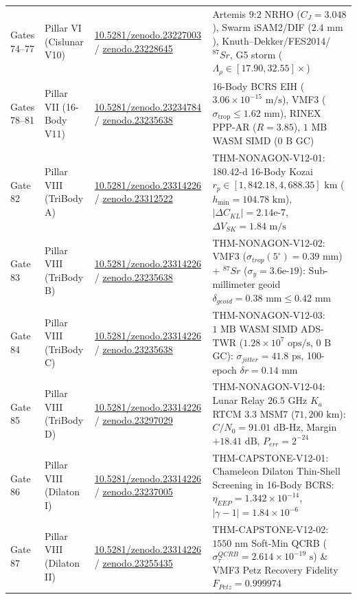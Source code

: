 \documentclass[11pt,a4paper,reqno]{article}
\def\bm#1{#1}%
\def\texttt#1{#1}%
\def\mathrm#1{#1}%
\def\mathcal#1{#1}%
\newcommand{\zenodo}[1]{\href{https://doi.org/10.5281/zenodo.#1}{\texttt{10.5281/\allowbreak zenodo.#1}}}
\newcommand{\zenodoshort}[1]{\href{https://doi.org/10.5281/zenodo.#1}{\texttt{zenodo.#1}}}
\theoremstyle{plain}
\theoremstyle{definition}
\theoremstyle{remark}
\numberwithin{equation}{section}
\begin{document}
\begin{longtable}{@{}P{2.2cm}P{2.8cm}P{3.4cm}P{7.8cm}@{}}
\texttt{Gates 74--77} & Pillar VI (Cislunar V10) & \zenodo{23227003} / \zenodoshort{23228645} & Artemis $9\text{:}2$ NRHO ($C_J=3.048$), Swarm iSAM2/DIF ($2.4\text{ mm}$), Knuth--Dekker/FES2014/$^{87}\mathrm{Sr}$, G5 storm ($\Lambda_\rho \in [17.90, 32.55]\times$) \\
\texttt{Gates 78--81} & Pillar VII (16-Body V11) & \zenodo{23234784} / \zenodoshort{23235638} & 16-Body BCRS EIH ($3.06 \times 10^{-15}\text{ m/s}$), VMF3 ($\sigma_{\text{trop}} \le 1.62\text{ mm}$), RINEX PPP-AR ($R=3.85$), $1\text{ MB}$ WASM SIMD ($0\text{ B}$ GC) \\
\midrule
\texttt{Gate 82} & Pillar VIII (TriBody A) & \zenodo{23314226} / \zenodoshort{23312522} & \texttt{THM-NONAGON-V12-01}: 180.42-d 16-Body Kozai $r_p \in [1,842.18, 4,688.35]\text{ km}$ ($h_{\min}=104.78\text{ km}$), $|\Delta C_{\mathrm{KL}}|=2.14\text{e-}7$, $\Delta V_{\mathrm{SK}}=1.84\text{ m/s}$ \\
\texttt{Gate 83} & Pillar VIII (TriBody B) & \zenodo{23314226} / \zenodoshort{23235638} & \texttt{THM-NONAGON-V12-02}: VMF3 ($\sigma_{\mathrm{trop}}(5^\circ)=0.39\text{ mm}$) + $^{87}\mathrm{Sr}$ ($\sigma_y=3.6\text{e-}19$): Sub-millimeter geoid $\delta_{\mathrm{geoid}} = \bm{0.38\text{ mm}} \le 0.42\text{ mm}$ \\
\texttt{Gate 84} & Pillar VIII (TriBody C) & \zenodo{23314226} / \zenodoshort{23235638} & \texttt{THM-NONAGON-V12-03}: $1\text{ MB}$ WASM SIMD ADS-TWR ($\bm{1.28\times 10^7\text{ ops/s}}$, $0\text{ B}$ GC): $\sigma_{\mathrm{jitter}} = \bm{41.8\text{ ps}}$, 100-epoch $\delta r = \bm{0.14\text{ mm}}$ \\
\texttt{Gate 85} & Pillar VIII (TriBody D) & \zenodo{23314226} / \zenodoshort{23297029} & \texttt{THM-NONAGON-V12-04}: Lunar Relay $26.5\text{ GHz}$ $K_a$ RTCM 3.3 MSM7 ($71,200\text{ km}$): $C/N_0 = \bm{91.01\text{ dB-Hz}}$, Margin $\bm{+18.41\text{ dB}}$, $P_{\mathrm{err}}=2^{-24}$ \\
\midrule
\texttt{Gate 86} & Pillar VIII (Dilaton I) & \zenodo{23314226} / \zenodoshort{23237005} & \texttt{THM-CAPSTONE-V12-01}: Chameleon Dilaton Thin-Shell Screening in 16-Body BCRS: $\eta_{\mathrm{EEP}} = \bm{1.342 \times 10^{-14}}$, $|\gamma-1| = \bm{1.84 \times 10^{-6}}$ \\
\texttt{Gate 87} & Pillar VIII (Dilaton II) & \zenodo{23314226} / \zenodoshort{23255435} & \texttt{THM-CAPSTONE-V12-02}: $1550\text{ nm}$ Soft-Min QCRB ($\sigma_\tau^{\mathrm{QCRB}} = \bm{2.614 \times 10^{-19}\text{ s}}$) \& VMF3 Petz Recovery Fidelity $\mathcal{F}_{\mathrm{Petz}} = \bm{0.999974}$ \\

\end{longtable}
\end{document}
